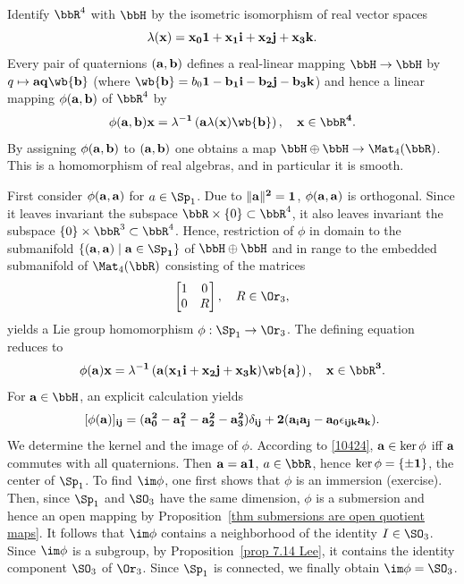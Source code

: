 \begin{example}\label{example universal covering groups of so3 and so4}
    Identify $\bbR^4$ with $\bbH$ by the isometric isomorphism of real vector spaces
    \[\lambda(\bf{x})=x_0\bf{1}+x_1 \bf{i}+x_2 \bf{j}+x_3 \bf{k}.\]
    Every pair of quaternions $(\bf{a},\bf{b})$ defines a real-linear mapping $\bbH\to \bbH$ by $q\mapsto \bf{a}q\wb{\bf{b}}$ (where $\wb{\bf{b}}=b_0 \bf{1}-b_1\bf{i}-b_2\bf{j}-b_3\bf{k}$) and hence a linear mapping $\phi(\bf{a},\bf{b})$ of $\bbR^4$ by
    \[\phi(\bf{a},\bf{b})x=\lambda^{-1}\left(\bf{a}\lambda(x)\wb{\bf{b}}\right),\quad x\in\bbR^4.\label{10423}\]
    By assigning $\phi(\bf{a},\bf{b})$ to $(\bf{a},\bf{b})$ one obtains a map $\bbH\oplus\bbH\to \Mat_4(\bbR)$. This is a homomorphism of real algebras, and in particular it is smooth.

    First consider $\phi(\bf{a},\bf{a})$ for $a\in\Sp_1$. Due to $\lVert \bf{a}\rVert^2=1$, $\phi(\bf{a},\bf{a})$ is orthogonal. Since it leaves invariant the subspace $\bbR\times\{0\}\subset\bbR^4$, it also leaves invariant the subspace $\{0\}\times\bbR^3\subset\bbR^4$. Hence, restriction of $\phi$ in domain to the submanifold $\{(\bf{a},\bf{a})\mid \bf{a}\in\Sp_1\}$ of $\bbH\oplus\bbH$ and in range to the embedded submanifold of $\Mat_4(\bbR)$ consisting of the matrices
    \[\begin{bmatrix}
        1&0\\0&R
    \end{bmatrix},\quad R\in\Or_3,\]
    yields a Lie group homomorphism $\phi:\Sp_1\to \Or_3$. The defining equation reduces to
    \[\phi(\bf{a})x=\lambda^{-1}\left(\bf{a}(x_1\bf{i}+x_2\bf{j}+x_3\bf{k})\wb{\bf{a}}\right),\quad x\in\bbR^3.\label{10424}\]
    For $\bf{a}\in\bbH$, an explicit calculation yields
    \[[\phi(\bf{a})]_{ij}=(a_0^2-a_1^2-a_2^2-a_3^2)\delta_{ij}+2(a_i a_j-a_0\epsilon_{ijk}a_k).\]
    We determine the kernel and the image of $\phi$. According to \eqref{10424}, $\bf{a}\in\ker\phi$ iff $\bf{a}$ commutes with all quaternions. Then $\bf{a}=a\bf{1}$, $a\in\bbR$, hence $\ker\phi=\{\pm \bf{1}\}$, the center of $\Sp_1$. To find $\im\phi$, one first shows that $\phi$ is an immersion (exercise). Then, since $\Sp_1$ and $\SO_3$ have the same dimension, $\phi$ is a submersion and hence an open mapping by Proposition~\ref{thm submersions are open quotient maps}. It follows that $\im\phi$ contains a neighborhood of the identity $I\in\SO_3$. Since $\im\phi$ is a subgroup, by Proposition~\ref{prop 7.14 Lee}, it contains the identity component $\SO_3$ of $\Or_3$. Since $\Sp_1$ is connected, we finally obtain $\im\phi=\SO_3$.


\end{example}
